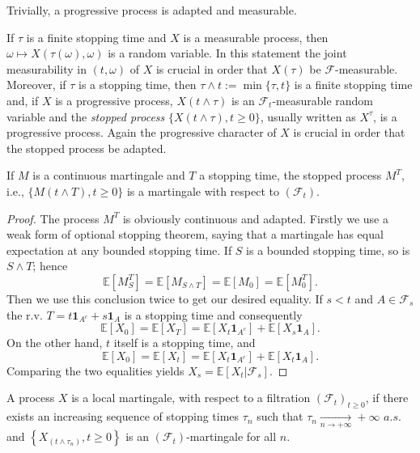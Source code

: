 Trivially, a progressive process is adapted and measurable.
\begin{remark}
	If $\tau$ is a finite stopping time and $X$ is a measurable process, then $\omega \mapsto X(\tau(\omega), \omega)$ is a random variable. In this statement the joint measurability in $(t, \omega)$ of $X$ is crucial in order that $X(\tau)$ be $\mathcal{F}$-measurable. Moreover, if $\tau$ is a stopping time, then $\tau \wedge t := \min \{\tau, t\}$ is a finite stopping time and, if $X$ is a progressive process, $X(t \wedge \tau)$ is an $\mathcal{F}_{t}$-measurable random variable and the \textit{stopped process} $\{X(t \wedge \tau), t \geq 0\}$, usually written as $ X^\tau $, is a progressive process. Again the progressive character of $X$ is crucial in order that the stopped process be adapted.
\end{remark}
\begin{proposition}\label{prop:stopped_martingale}
	If $M$ is a continuous martingale and $T$ a stopping time, the stopped process $M^{T}$, i.e., $\{M(t \wedge T), t \geq 0\}$ is a martingale with respect to $\left(\mathcal{F}_{t}\right)$.
\end{proposition}
\begin{proof}
	The process $M^{T}$ is obviously continuous and adapted.
	Firstly we use a weak form of optional stopping theorem, saying that a martingale has equal expectation at any bounded stopping time. If $S$ is a bounded stopping time, so is $S \wedge T$; hence \[ \mathbb{E}\left[M_{S}^{T}\right]=\mathbb{E}\left[M_{S \wedge T}\right]=\mathbb{E}\left[M_{0}\right]=\mathbb{E}\left[M_{0}^{T}\right]. \]
	Then we use this conclusion twice to get our desired equality. If $s<t$ and $A \in \mathcal{F}_{s}$ the r.v. $T=t \mathbf{1}_{A^{c}}+s \mathbf{1}_{A}$ is a stopping time and consequently
	\[ \mathbb{E}\left[X_{0}\right]=\mathbb{E}\left[X_{T}\right]=\mathbb{E}\left[X_{t} \mathbf{1}_{A^{c}}\right]+\mathbb{E}\left[X_{s} \mathbf{1}_{A}\right] .\]
	On the other hand, $t$ itself is a stopping time, and \[ \mathbb{E}\left[X_{0}\right]=\mathbb{E}\left[X_{t}\right]=\mathbb{E}\left[X_{t} \mathbf{1}_{A^{c}}\right]+\mathbb{E}\left[X_{t} \mathbf{1}_{A}\right]. \]
	Comparing the two equalities yields $X_{s}=\mathbb{E}\left[X_{t} | \mathcal{F}_{s}\right].$
\end{proof}
\begin{definition}
	A process $X$ is a local martingale, with respect to a filtration $(\mathcal{F}_{t})_{t \geq 0}$, if there exists an increasing sequence of stopping times $\tau_{n}$ such that $\tau_{n} \underset{n \rightarrow+\infty}{\longrightarrow}+\infty$ $a.s.$ and $\left\{X_{\left(t \wedge \tau_{n}\right)}, t \geq 0\right\}$ is an $\left(\mathcal{F}_{t}\right)$-martingale for all $n$.

\end{definition}
